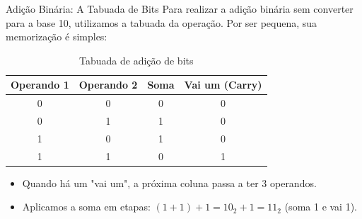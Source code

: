 \begin{frame}{Adição Binária: A Tabuada de Bits}
    Para realizar a adição binária sem converter para a base 10, utilizamos a tabuada da operação. Por ser pequena, sua memorização é simples:

    \begin{table}[h]
        \centering
        \begin{tabular}{|c|c|c|c|}
            \hline
            \textbf{Operando 1} & \textbf{Operando 2} & \textbf{Soma} & \textbf{Vai um (Carry)} \\ \hline
            0                   & 0                   & 0             & 0                       \\ \hline
            0                   & 1                   & 1             & 0                       \\ \hline
            1                   & 0                   & 1             & 0                       \\ \hline
            1                   & 1                   & 0             & 1                       \\ \hline
        \end{tabular}
        \caption{Tabuada de adição de bits}
        \label{tabuada2+}
    \end{table}

    \begin{itemize}
        \item Quando há um "vai um", a próxima coluna passa a ter 3 operandos.
        \item Aplicamos a soma em etapas: $(1 + 1) + 1 = 10_2 + 1 = 11_2$ (soma 1 e vai 1).
    \end{itemize}
\end{frame}


